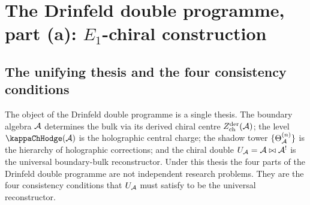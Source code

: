 \section{The Drinfeld double programme, part (a): $E_1$-chiral construction}
\label{sec:drinfeld-double-e1}

\subsection*{The unifying thesis and the four consistency conditions}

The object of the Drinfeld double programme is a single thesis.
The boundary algebra $\mathcal{A}$ determines the bulk via its derived
chiral centre $Z^{\mathrm{der}}_{\mathrm{ch}}(\mathcal{A})$; the level
$\kappaChHodge(\cA)$ is the holographic central charge; the shadow
tower $\{\Theta_{\mathcal{A}}^{(n)}\}$ is the hierarchy of holographic
corrections; and the chiral double $U_{\mathcal{A}} = \mathcal{A} \bowtie \mathcal{A}^!$
is the universal boundary-bulk reconstructor. Under this
thesis the four parts of the Drinfeld double programme are not
independent research problems. They are the four consistency
conditions that $U_{\mathcal{A}}$ must satisfy to be the universal
reconstructor.

